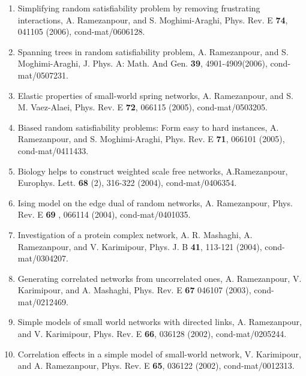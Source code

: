 \documentclass[aps,preprint]{revtex4-1}
\begin{document}
\begin{enumerate}
\item   Simplifying random satisfiability problem by removing frustrating interactions, A. Ramezanpour, and S. Moghimi-Araghi, Phys. Rev. E  \textbf{74}, 041105 (2006), cond-mat/0606128.


\item   Spanning trees in random satisfiability problem,
A. Ramezanpour, and S. Moghimi-Araghi, J. Phys. A: Math. And  Gen.  \textbf{39}, 4901-4909(2006), cond-mat/0507231.

\item    Elastic properties of small-world spring networks, A. Ramezanpour, and S. M. Vaez-Alaei,  Phys. Rev. E  \textbf{72}, 066115 (2005), cond-mat/0503205.

\item    Biased random satisfiability problems: Form easy to hard instances, A. Ramezanpour, and S. Moghimi-Araghi, Phys. Rev. E  \textbf{71}, 066101 (2005), cond-mat/0411433.

\item    Biology helps to construct weighted scale free networks,
A.Ramezanpour, Europhys. Lett. \textbf{68} (2), 316-322 (2004), cond-mat/0406354.


\item    Ising model on the edge dual of random networks, A. Ramezanpour, Phys. Rev. E \textbf{69} , 066114 (2004), cond-mat/0401035.


\item    Investigation of a protein complex network, A. R. Mashaghi, A. Ramezanpour, and V. Karimipour,  Phys. J. B \textbf{41}, 113-121  (2004), cond-mat/0304207.

\item    Generating correlated networks from uncorrelated ones, A. Ramezanpour, V. Karimipour, and A. Mashaghi, Phys. Rev. E \textbf{67} 046107 (2003), cond-mat/0212469.


\item    Simple models of small world networks with directed links, A. Ramezanpour, and V. Karimipour, Phys. Rev. E \textbf{66}, 036128 (2002), cond-mat/0205244.


\item   Correlation effects in a simple model of small-world network, V. Karimipour, and A. Ramezanpour, Phys. Rev. E \textbf{65}, 036122 (2002), cond-mat/0012313.



\end{enumerate}


\bigskip
\end{document}

